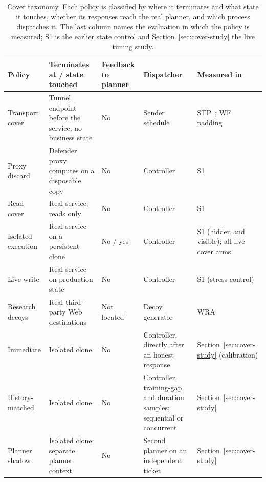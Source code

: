 \begin{table}[t]\centering\small
\caption{Cover taxonomy. Each policy is classified by where it terminates and what state it touches, whether its responses reach the real planner, and which process dispatches it. The last column names the evaluation in which the policy is measured; S1 is the earlier state control and Section~\ref{sec:cover-study} the live timing study.}\label{tab:cover-taxonomy}
\setlength{\tabcolsep}{4pt}
\begin{tabularx}{\textwidth}{@{}P{.17\textwidth}P{.26\textwidth}P{.13\textwidth}P{.2\textwidth}Y@{}}\toprule
Policy & Terminates at / state touched & Feedback to planner & Dispatcher & Measured in \\\midrule
Transport cover & Tunnel endpoint before the service; no business state & No & Sender schedule & STP~\cite{apthorpe2019stp}; WF padding~\cite{juarez2016wtfpad,gong2020front} \\
Proxy discard & Defender proxy computes on a disposable copy & No & Controller & S1 \\
Read cover & Real service; reads only & No & Controller & S1 \\
Isolated execution & Real service on a persistent clone & No / yes & Controller & S1 (hidden and visible); all live cover arms \\
Live write & Real service on production state & No & Controller & S1 (stress control) \\
Research decoys & Real third-party Web destinations & Not located & Decoy generator & WRA~\cite{jeong2026wra} \\\midrule
Immediate & Isolated clone & No & Controller, directly after an honest response & Section~\ref{sec:cover-study} (calibration) \\
History-matched & Isolated clone & No & Controller, training-gap and duration samples; sequential or concurrent & Section~\ref{sec:cover-study} \\
Planner shadow & Isolated clone; separate planner context & No & Second planner on an independent ticket & Section~\ref{sec:cover-study} \\\bottomrule
\end{tabularx}\end{table}
